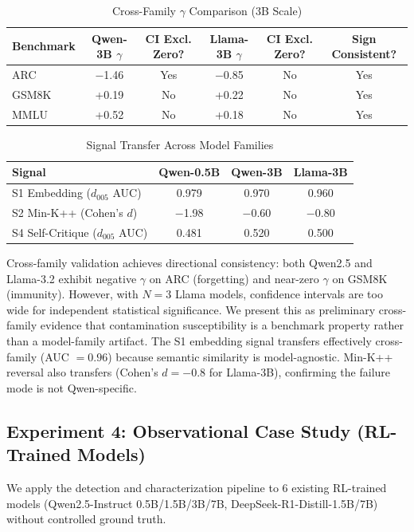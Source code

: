 \documentclass[11pt]{article}
\begin{document}
\begin{table}[h]
\centering
\caption{Cross-Family $\gamma$ Comparison (3B Scale)}
\label{tab:cross_gamma}
\begin{tabular}{lccccc}
\toprule
Benchmark & Qwen-3B $\gamma$ & CI Excl. Zero? & Llama-3B $\gamma$ & CI Excl. Zero? & Sign Consistent? \\
\midrule
ARC & $-$1.46 & Yes & $-$0.85 & No & Yes \\
GSM8K & +0.19 & No & +0.22 & No & Yes \\
MMLU & +0.52 & No & +0.18 & No & Yes \\
\bottomrule
\end{tabular}
\end{table}

\begin{table}[h]
\centering
\caption{Signal Transfer Across Model Families}
\label{tab:signal_transfer}
\begin{tabular}{lccc}
\toprule
Signal & Qwen-0.5B & Qwen-3B & Llama-3B \\
\midrule
S1 Embedding ($d_{005}$ AUC) & 0.979 & 0.970 & 0.960 \\
S2 Min-K++ (Cohen's $d$) & $-$1.98 & $-$0.60 & $-$0.80 \\
S4 Self-Critique ($d_{005}$ AUC) & 0.481 & 0.520 & 0.500 \\
\bottomrule
\end{tabular}
\end{table}

Cross-family validation achieves directional consistency: both Qwen2.5 and Llama-3.2 exhibit negative $\gamma$ on ARC (forgetting) and near-zero $\gamma$ on GSM8K (immunity). However, with $N=3$ Llama models, confidence intervals are too wide for independent statistical significance. We present this as preliminary cross-family evidence that contamination susceptibility is a benchmark property rather than a model-family artifact. The S1 embedding signal transfers effectively cross-family (AUC $= 0.96$) because semantic similarity is model-agnostic. Min-K++ reversal also transfers (Cohen's $d = -0.8$ for Llama-3B), confirming the failure mode is not Qwen-specific.

\subsection{Experiment 4: Observational Case Study (RL-Trained Models)}
\label{sec:observational}

We apply the detection and characterization pipeline to 6 existing RL-trained models (Qwen2.5-Instruct 0.5B/1.5B/3B/7B, DeepSeek-R1-Distill-1.5B/7B) without controlled ground truth.
\end{document}
